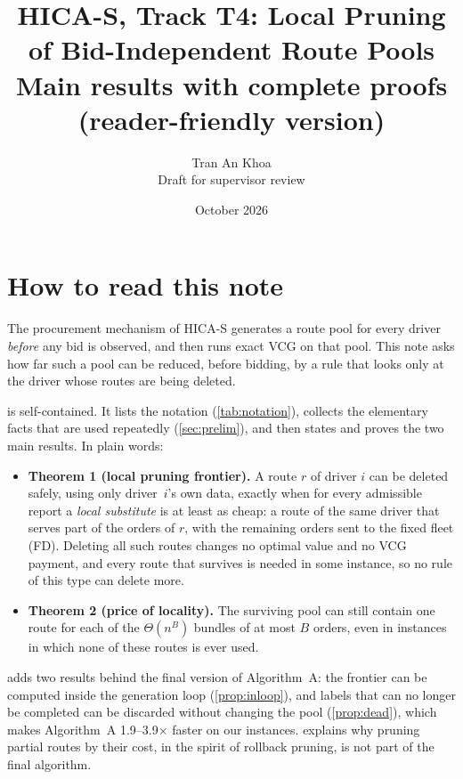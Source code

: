 \documentclass[11pt]{article}
\title{HICA-S, Track T4: Local Pruning of Bid-Independent Route Pools\\[3pt]
\large Main results with complete proofs (reader-friendly version)}
\author{Tran An Khoa\\ \small Draft for supervisor review}
\date{October 2026}
\theoremstyle{definition}
\theoremstyle{remark}
\begin{document}
\maketitle

\section*{How to read this note}

The procurement mechanism of HICA-S generates a route pool for every driver
\emph{before} any bid is observed, and then runs exact VCG on that pool. This
note asks how far such a pool can be reduced, before bidding, by a rule that
looks only at the driver whose routes are being deleted.

 is self-contained. It lists the notation (\cref{tab:notation}),
collects the elementary facts that are used repeatedly (\cref{sec:prelim}), and
then states and proves the two main results. In plain words:

\begin{itemize}[leftmargin=1.4em, itemsep=2pt]
\item \textbf{Theorem 1 (local pruning frontier).} A route $r$ of driver $i$
can be deleted safely, using only driver~$i$'s own data, exactly when for every
admissible report a \emph{local substitute} is at least as cheap: a route of
the same driver that serves part of the orders of $r$, with the remaining
orders sent to the fixed fleet (FD). Deleting all such routes changes no
optimal value and no VCG payment, and every route that survives is needed in
some instance, so no rule of this type can delete more.
\item \textbf{Theorem 2 (price of locality).} The surviving pool can still
contain one route for each of the $\Theta(n^B)$ bundles of at most $B$ orders,
even in instances in which none of these routes is ever used.
\end{itemize}
 adds two results behind the final version of
Algorithm~A: the frontier can be computed inside the generation loop
(\cref{prop:inloop}), and labels that can no longer be completed can be
discarded without changing the pool (\cref{prop:dead}), which makes
Algorithm~A 1.9--3.9$\times$ faster on our instances. 
explains why pruning partial routes by their cost, in the spirit of rollback
pruning, is not part of the final algorithm.
\end{document}
